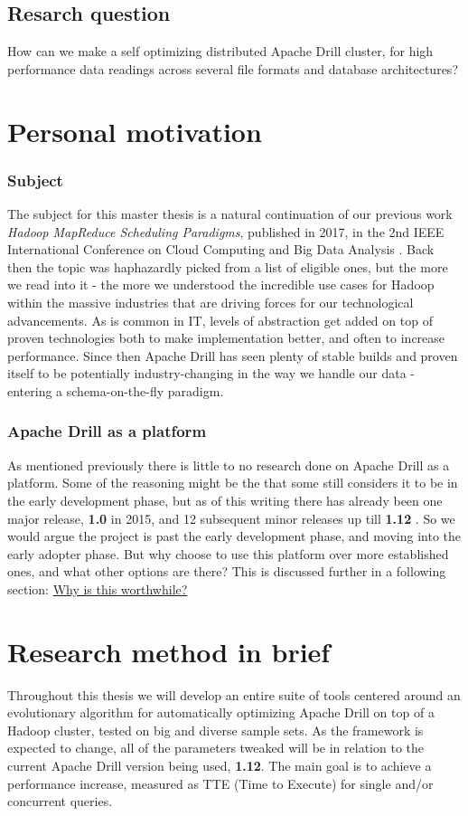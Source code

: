 \documentclass[a4paper,english]{report}
\begin{document}
		\subsection{Resarch question}
		How can we make a self optimizing distributed Apache Drill cluster, for high performance data readings across several file formats and database architectures?
		
		\section{Personal motivation}
			\subsubsection{Subject}
			The subject for this master thesis is a natural continuation of our previous work \emph{Hadoop MapReduce Scheduling Paradigms}, published in 2017, in the 2nd IEEE International Conference on Cloud Computing and Big Data Analysis \cite{own}. Back then the topic was haphazardly picked from a list of eligible ones, but the more we read into it - the more we understood the incredible use cases for Hadoop within the massive industries that are driving forces for our technological advancements. As is common in IT, levels of abstraction get added on top of proven technologies both to make implementation better, and often to increase performance. Since then Apache Drill has seen plenty of stable builds and proven itself to be potentially industry-changing in the way we handle our data - entering a schema-on-the-fly paradigm.
			
			\subsubsection{Apache Drill as a platform}
			As mentioned previously there is little to no research done on Apache Drill as a platform. Some of the reasoning might be the that some still considers it to be in the early development phase, but as of this writing there has already been one major release, \textbf{1.0} in 2015, and 12 subsequent minor releases up till \textbf{1.12} \cite{drill_releases}. So we would argue the project is past the early development phase, and moving into the early adopter phase. But why choose to use this platform over more established ones, and what other options are there? This is discussed further in a following section: \hyperref[sec:why_drill]{Why is this worthwhile?}
			
		
		\section{Research method in brief}
		Throughout this thesis we will develop an entire suite of tools centered around an evolutionary algorithm for automatically optimizing Apache Drill on top of a Hadoop cluster, tested on big and diverse sample sets. As the framework is expected to change, all of the parameters tweaked will be in relation to the current Apache Drill version being used, \textbf{1.12}. The main goal is to achieve a performance increase, measured as TTE (Time to Execute) for single and/or concurrent queries.
		
\end{document}
